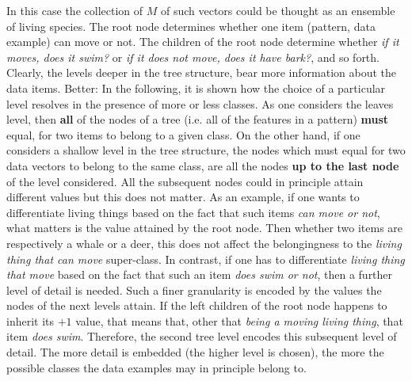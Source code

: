 \documentclass[a4paper,12pt]{article}
\begin{document}
In this case the collection of $M$ of such vectors could be thought as an ensemble of living species. The root node determines whether one item (pattern, data example) can move or not. The children of the root node determine whether \textit{if it moves, does it swim?} or \textit{if it does not move, does it have bark?}, and so forth. Clearly, the levels deeper in the tree structure, bear more information about the data items. Better: In the following, it is shown how the choice of a particular level resolves in the presence of more or less classes. As one considers the leaves level, then \textbf{all} of the nodes of a tree (i.e. all of the features in a pattern) \textbf{must} equal, for two items to belong to a given class. On the other hand, if one considers a shallow level in the tree structure, the nodes which must equal for two data vectors to belong to the same class, are all the nodes \textbf{up to the last node} of the level considered. All the subsequent nodes could in principle attain different values but this does not matter. As an example, if one wants to differentiate living things based on the fact that such items \textit{can move or not}, what matters is the value attained by the root node. Then whether two items are respectively a whale or a deer, this does not affect the belongingness to the \textit{living thing that can move} super-class. In contrast, if one has to differentiate \textit{living thing that move} based on the fact that such an item \textit{does swim or not}, then a further level of detail is needed. Such a finer granularity is encoded by the values the nodes of the next levels attain. If the left children of the root node happens to inherit its $+1$ value, that means that, other that \textit{being a moving living thing}, that item \textit{does swim}. Therefore, the second tree level encodes this subsequent level of detail. The more detail is embedded (the higher level is chosen), the more the possible classes the data examples may in principle belong to.
\end{document}
